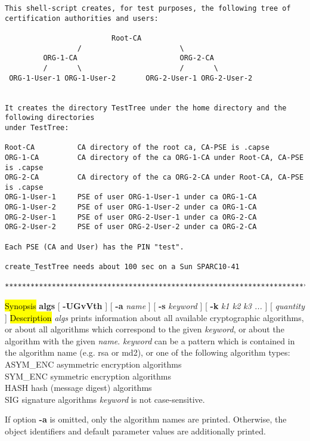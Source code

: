 {\begin{verbatim}
This shell-script creates, for test purposes, the following tree of 
certification authorities and users: 
 
                         Root-CA 
                 /                       \ 
         ORG-1-CA                        ORG-2-CA 
         /       \                       /       \ 
 ORG-1-User-1 ORG-1-User-2       ORG-2-User-1 ORG-2-User-2 
 
 
It creates the directory TestTree under the home directory and the following directories 
under TestTree: 
 
Root-CA          CA directory of the root ca, CA-PSE is .capse
ORG-1-CA         CA directory of the ca ORG-1-CA under Root-CA, CA-PSE is .capse
ORG-2-CA         CA directory of the ca ORG-2-CA under Root-CA, CA-PSE is .capse
ORG-1-User-1     PSE of user ORG-1-User-1 under ca ORG-1-CA
ORG-1-User-2     PSE of user ORG-1-User-2 under ca ORG-1-CA
ORG-2-User-1     PSE of user ORG-2-User-1 under ca ORG-2-CA
ORG-2-User-2     PSE of user ORG-2-User-2 under ca ORG-2-CA

Each PSE (CA and User) has the PIN "test".
 
create_TestTree needs about 100 sec on a Sun SPARC10-41

****************************************************************************************
\end{verbatim}
}

\label{algs}
\hl{Synopsis}
{\bf algs} [ {\bf -UGvVth} ] [ {\bf -a} {\em name} ] [ {\bf -s} {\em keyword} ] [ {\bf -k} {\em k1 k2 k3 ...} ] [ {\em quantity} ]
\hl{Description}
{\em algs} prints information about all available cryptographic algorithms, or about all algorithms 
which correspond to the given {\em keyword}, or about the algorithm with the given {\em name}.
{\em keyword} can be a pattern which is contained in the algorithm name (e.g. rsa or md2), or one of the 
following algorithm types:
\bvtab
ASYM\_ENC \4 asymmetric encryption algorithms \\
SYM\_ENC  \4 symmetric encryption algorithms  \\
HASH      \4 hash (message digest) algorithms \\
SIG       \4 signature algorithms  
\evtab
{\em keyword} is not case-sensitive.

If option {\bf -a} is omitted, only the algorithm names are printed. 
Otherwise, the object identifiers and default parameter values are additionally printed. 

